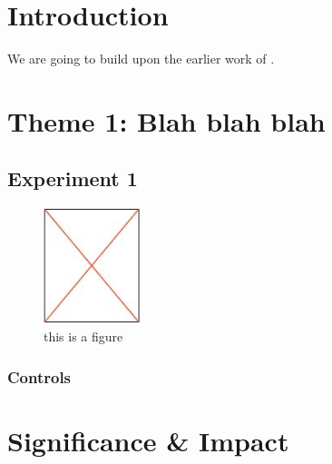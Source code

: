 \documentclass[12pt]{article}
\begin{document}
\section*{Introduction}

We are going to build upon the earlier work of \cite{hodgkin1952propagation}. \lipsum[1-7]

\section*{Theme 1: Blah blah blah}

\lipsum[8]

\subsection*{Experiment 1}

\lipsum[9]

\begin{figure}
  \vspace{-27pt}
  \begin{center}
    \includegraphics[width=0.25\textwidth]{figure_placeholder}
    \caption{this is a figure}
    \label{a_label}
  \end{center}
  \vspace{-25pt}
\end{figure}

\lipsum[10]

\subsubsection*{Controls}

\lipsum[11]

\section*{Significance \& Impact}

\lipsum[12]

\newpage
\setcounter{page}{1}
\fancyfoot[C]{\thepage}



\end{document}
